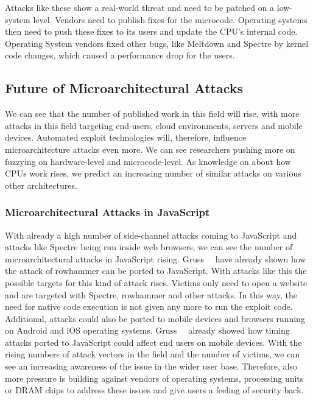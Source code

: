 Attacks like these show a real-world threat and need to be patched on a
low-system level. Vendors need to publish fixes for the microcode. Operating
systems then need to push these fixes to its users and update the CPU's internal
code. Operating System vendors fixed other bugs, like Meltdown and Spectre by
kernel code changes, which caused a performance drop for the users.

\subsection{Future of Microarchitectural Attacks}

We can see that the number of published work in this field will rise, with more
attacks in this field targeting end-users, cloud environments, servers and
mobile devices. Automated exploit technologies will, therefore, influence
microarchitecture attacks even more. We can see researchers pushing more on
fuzzying on hardware-level and microcode-level. As knowledge on about how CPUs
work rises, we predict an increasing number of similar attacks on various other
architectures.

\subsubsection{Microarchitectural Attacks in JavaScript}

With already a high number of side-channel attacks coming to JavaScript and
attacks like Spectre being run inside web browsers, we can see the number of
microarchitectural attacks in JavaScript rising. Gruss~\etal~\cite{rowhammerjs}
have already shown how the attack of rowhammer can be ported to JavaScript. With
attacks like this the possible targets for this kind of attack rises. Victims
only need to open a website and are targeted with Spectre, rowhammer and other
attacks. In this way, the need for native code execution is not given any more
to run the exploit code. Additional, attacks could also be ported to mobile
devices and browsers running on Android and iOS operating systems.
Gruss~\etal~\cite{keytimejs} already showed how timing attacks ported to
JavaScript could affect end users on mobile devices. With the rising numbers of
attack vectors in the field and the number of victims, we can see an increasing
awareness of the issue in the wider user base. Therefore, also more pressure is
building against vendors of operating systems, processing units or DRAM chips to
address these issues and give users a feeling of security back.

